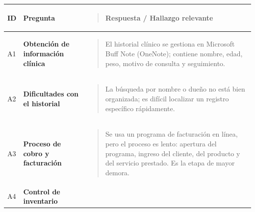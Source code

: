 \documentclass[
]{article}
\newcounter{none} %
\begin{document}
{\def\LTcaptype{none} %
\begin{longtable}[]{@{}
  >{\centering\arraybackslash}p{}
  >{\raggedright\arraybackslash}p{}
  >{\raggedright\arraybackslash}p{}@{}}
\toprule\noalign{}
\begin{minipage}[b]{\linewidth}\centering
\textbf{ID}
\end{minipage} & \begin{minipage}[b]{\linewidth}\centering
\textbf{Pregunta}
\end{minipage} & \begin{minipage}[b]{\linewidth}\raggedright
\begin{quote}
\textbf{Respuesta / Hallazgo relevante}
\end{quote}
\end{minipage} \\
\midrule\noalign{}
\endhead
\bottomrule\noalign{}
\endlastfoot
A1 & \textbf{Obtención de información clínica} &
\begin{minipage}[t]{\linewidth}\raggedright
\begin{quote}
El historial clínico se gestiona en Microsoft Buff Note (OneNote);
contiene nombre, edad, peso, motivo de consulta y seguimiento.
\end{quote}
\end{minipage} \\
A2 & \textbf{Dificultades con el historial} &
\begin{minipage}[t]{\linewidth}\raggedright
\begin{quote}
La búsqueda por nombre o dueño no está bien organizada; es difícil
localizar un registro específico rápidamente.
\end{quote}
\end{minipage} \\
A3 & \textbf{Proceso de cobro y facturación} &
\begin{minipage}[t]{\linewidth}\raggedright
\begin{quote}
Se usa un programa de facturación en línea, pero el proceso es lento:
apertura del programa, ingreso del cliente, del producto y del servicio
prestado. Es la etapa de mayor demora.
\end{quote}
\end{minipage} \\
A4 & \textbf{Control de inventario} &
\begin{minipage}[t]{\linewidth}\raggedright

\end{minipage}
\end{longtable}}
\end{document}
